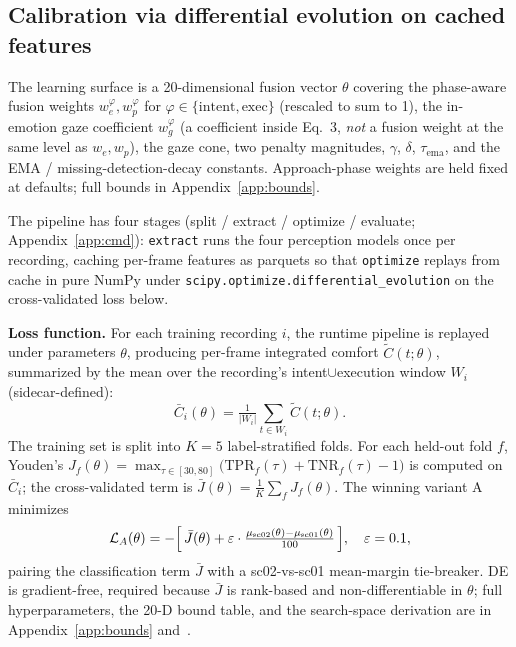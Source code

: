 \documentclass{article}
\newcommand{\code}[1]{\texttt{\small #1}}
\begin{document}
\subsection{Calibration via differential evolution on cached features}

The learning surface is a 20-dimensional fusion vector $\theta$ covering the phase-aware fusion weights $w_e^\varphi, w_p^\varphi$ for $\varphi \in \{\text{intent}, \text{exec}\}$ (rescaled to sum to 1), the in-emotion gaze coefficient $w_g^\varphi$ (a coefficient inside Eq.~3, \emph{not} a fusion weight at the same level as $w_e, w_p$), the gaze cone, two penalty magnitudes, $\gamma$, $\delta$, $\tau_\text{ema}$, and the EMA / missing-detection-decay constants. Approach-phase weights are held fixed at defaults; full bounds in Appendix~\ref{app:bounds}.

The pipeline has four stages (split / extract / optimize / evaluate; Appendix~\ref{app:cmd}): \code{extract} runs the four perception models once per recording, caching per-frame features as parquets so that \code{optimize} replays from cache in pure NumPy under \code{scipy.optimize.differential\_evolution} on the cross-validated loss below.

\textbf{Loss function.} For each training recording $i$, the runtime pipeline is replayed under parameters $\theta$, producing per-frame integrated comfort $\tilde{C}(t;\theta)$, summarized by the mean over the recording's intent$\cup$execution window $W_i$ (sidecar-defined):
\begin{equation}
\bar{C}_i(\theta) = \tfrac{1}{|W_i|}\sum_{t \in W_i} \tilde{C}(t;\theta).
\end{equation}
The training set is split into $K=5$ label-stratified folds. For each held-out fold $f$, Youden's $J_f(\theta) = \max_{\tau \in [30, 80]} \bigl(\text{TPR}_f(\tau) + \text{TNR}_f(\tau) - 1\bigr)$ is computed on $\bar{C}_i$; the cross-validated term is $\bar{J}(\theta) = \tfrac{1}{K}\sum_f J_f(\theta)$. The winning variant A minimizes
\begin{equation}
\mathcal{L}_A(\theta) = -\Bigl[\,\bar{J}(\theta) + \varepsilon \cdot \tfrac{\mu_\text{sc02}(\theta) - \mu_\text{sc01}(\theta)}{100}\,\Bigr],\quad \varepsilon = 0.1, \label{eq:loss}
\end{equation}
pairing the classification term $\bar{J}$ with a sc02-vs-sc01 mean-margin tie-breaker. DE is gradient-free, required because $\bar{J}$ is rank-based and non-differentiable in $\theta$; full hyperparameters, the 20-D bound table, and the search-space derivation are in Appendix~\ref{app:bounds} and~\cite{ref30}.
\end{document}
